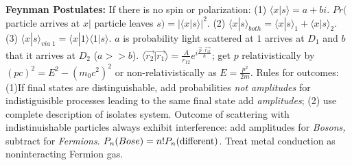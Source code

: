 {\bf Feynman Postulates:}  If there is no spin or polarization:
(1) $ \langle x|s \rangle = a+bi$.  $Pr($ particle arrives at $x | $ particle leaves $s)= | \langle x|s \rangle |^2$.
(2) $ \langle x|s \rangle_{both}=  \langle x|s \rangle_{1} +  \langle x|s \rangle_{2}$.
(3) $ \langle x|s \rangle_{via \; 1}=  \langle x|1 \rangle   \langle 1|s \rangle $. $a$ is probability light scattered at $1$ arrives at
$D_1$ and $b$ that it arrives at $D_2$ ($a>>b$).  
$ \langle {\vec {r_2}} | {\vec {r_1}} \rangle 
= {\frac A {r_{12}}} e^{i {\frac {{\vec p} \cdot {\vec {r_{12}}}} {\hbar}}}$; get $p$
relativistically by  $(pc)^2=E^2-(m_0 c^2)^2$ or non-relativistically as $E={\frac {p^2} {2m}}$.
Rules for outcomes: (1)If final states are distinguishable, add probabilities \emph {not amplitudes}
for indistiguisible processes leading to the same final state add \emph {amplitudes};
(2) use complete description of isolates system.  Outcome of scattering with indistinuishable
particles always exhibit interference: 
add amplitudes for \emph{Bosons,} subtract for \emph{Fermions}.
$P_n(Bose)= n!P_n(\textnormal{different})$.  
Treat metal conduction as noninteracting Fermion gas.
